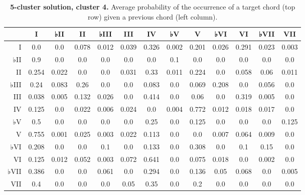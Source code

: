 \begin{table}[htbp]
\begin{minipage}{\linewidth}
\setlength{\tymax}{0.5\linewidth}
\centering
\small
\caption{\textbf{5-cluster solution, cluster 4.} Average probability of the occurrence of a target chord (top row) given a previous chord (left column).}
\label{5-clustersolutioncluster4.averageprobabilityoftheoccurrenceofatargetchordtoprowgivenapreviouschordleftcolumn.}
\begin{tabulary}{\textwidth}{@{}RCCCCCCCCCCCC@{}} \toprule
&I&♭II&II&♭III&III&IV&♭V&V&♭VI&VI&♭VII&VII\\
\midrule
I&0.0&0.0&0.078&0.012&0.039&0.326&0.002&0.201&0.026&0.291&0.023&0.003\\
♭II&0.9&0.0&0.0&0.0&0.0&0.0&0.1&0.0&0.0&0.0&0.0&0.0\\
II&0.254&0.022&0.0&0.0&0.031&0.33&0.011&0.224&0.0&0.058&0.06&0.011\\
♭III&0.24&0.083&0.26&0.0&0.0&0.083&0.0&0.069&0.208&0.0&0.056&0.0\\
III&0.038&0.005&0.132&0.026&0.0&0.414&0.0&0.06&0.0&0.319&0.005&0.0\\
IV&0.125&0.0&0.022&0.006&0.024&0.0&0.004&0.772&0.012&0.018&0.017&0.0\\
♭V&0.5&0.0&0.0&0.0&0.0&0.25&0.0&0.125&0.0&0.0&0.0&0.125\\
V&0.755&0.001&0.025&0.003&0.022&0.113&0.0&0.0&0.007&0.064&0.009&0.0\\
♭VI&0.208&0.0&0.0&0.1&0.0&0.133&0.0&0.308&0.0&0.1&0.15&0.0\\
VI&0.125&0.012&0.052&0.003&0.072&0.641&0.0&0.075&0.018&0.0&0.002&0.0\\
♭VII&0.386&0.0&0.0&0.061&0.0&0.294&0.0&0.136&0.05&0.068&0.0&0.005\\
VII&0.4&0.0&0.0&0.0&0.05&0.35&0.0&0.2&0.0&0.0&0.0&0.0\\

\bottomrule

\end{tabulary}
\end{minipage}
\end{table}

